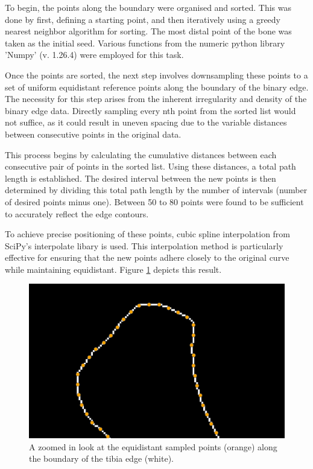 \documentclass{micro-econ-thesis}
\begin{document}
To begin, the points along the boundary were organised and sorted. This was done by first, defining a starting point, and then iteratively using a greedy nearest neighbor algorithm for sorting. The most distal point of the bone was taken as the initial seed. Various functions from the numeric python library 'Numpy' (v. 1.26.4) were employed for this task. 


Once the points are sorted, the next step involves downsampling these points to a set of uniform equidistant reference points along the boundary of the binary edge. The necessity for this step arises from the inherent irregularity and density of the binary edge data. Directly sampling every nth point from the sorted list would not suffice, as it could result in uneven spacing due to the variable distances between consecutive points in the original data.

This process begins by calculating the cumulative distances between each consecutive pair of points in the sorted list. Using these distances, a total path length is established. The desired interval between the new points is then determined by dividing this total path length by the number of intervals (number of desired points minus one). Between 50 to 80 points were found to be sufficient to accurately reflect the edge contours. 

To achieve precise positioning of these points, cubic spline interpolation from SciPy's interpolate libary is used. This interpolation method is particularly effective for ensuring that the new points adhere closely to the original curve while maintaining equidistant. 
Figure \ref{fig:downsampled} depicts this result. 
\begin{figure}[H]
	\centering
	\includegraphics[width=0.7\linewidth]{downsampled}
	\caption{A zoomed in look at the equidistant sampled points (orange) along the boundary of the tibia edge (white).}
	\label{fig:downsampled}
\end{figure}
\end{document}
